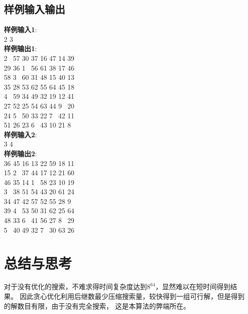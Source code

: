 \documentclass[UTF8,a4paper]{article}
\begin{document}
\subsection{样例输入输出}
\noindent\textbf{样例输入1}:\\
2 3\\
\noindent\textbf{样例输出1}:\\
2~ 57 30 37 16 47 14 39\\
29 36 1~ 56 61 38 17 46\\
58 3~ 60 31 48 15 40 13\\
35 28 53 62 55 64 45 18\\
4~ 59 34 49 32 19 12 41\\
27 52 25 54 63 44 9~ 20\\
24 5~  50 33 22 7~ 42 11\\
51 26 23 6~ 43 10 21 8\\
\noindent\textbf{样例输入2}:\\
3 4\\
\noindent\textbf{样例输出2}:\\
36 45 16 13 22 59 18 11\\
15 2~ 37 44 17 12 21 60\\
46 35 14 1~ 58 23 10 19\\
3~ 38 51 54 43 20 61 24\\
34 47 42 57 52 55 28 9~\\
39 4~ 53 50 31 62 25 64\\
48 33 6~ 41 56 27 8~ 29\\
5~ 40 49 32 7~ 30 63 26\\
\section{总结与思考}
对于没有优化的搜索，不难求得时间复杂度达到$8^{64}$，显然难以在短时间得到结果。
因此贪心优化利用后继数最少压缩搜索量，较快得到一组可行解，但是得到的解数目有限，由于没有完全搜索，
这是本算法的弊端所在。
\end{document}
